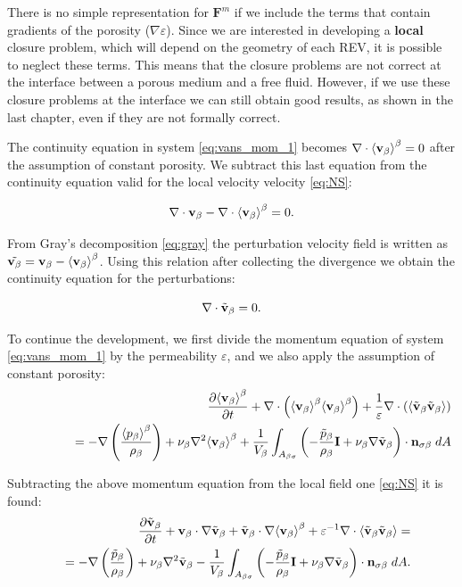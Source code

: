There is no simple representation for $\mathbf{F}^m$ if we include the terms that contain gradients of the porosity ($\nabla \varepsilon$).
Since we are interested in developing a \textbf{local} closure problem, which will depend on the geometry of each REV, it is possible to neglect these terms.
This means that the closure problems are not correct at the interface between a porous medium and a free fluid. 
However, if we use these closure problems at the interface we can still obtain good results, as shown in the last chapter, even if they are not formally correct.

The continuity equation in system \eqref{eq:vans_mom_1} becomes $ \nabla \cdot  {\left< \textbf{v}_{\beta}\right>}^{\beta}=0$ after the assumption of constant porosity.
We subtract this last equation from the continuity equation valid for the local velocity velocity \eqref{eq:NS}:

$$
\nabla \cdot  \textbf{v}_{\beta} - \nabla \cdot  {\left< \textbf{v}_{\beta}\right>}^{\beta} = 0.
$$

From Gray's decomposition \eqref{eq:gray} the perturbation velocity field is written as $\tilde{\textbf{v}_{\beta}} = \textbf{v}_{\beta} - {\left< \textbf{v}_{\beta} \right>}^{\beta}$. Using this relation after collecting the divergence we obtain the continuity equation for the perturbations:

\begin{equation}
\nabla \cdot \tilde{\textbf{v}}_{\beta} = 0.
\end{equation}

\newpage 
\noindent To continue the development, we first divide the momentum equation of system \eqref{eq:vans_mom_1} by the permeability $\varepsilon$, and we also apply the assumption of constant porosity:
\begin{eqnarray}
&& \dfrac{\partial {\left< \textbf{v}_{\beta}\right>}^{\beta}}{\partial t} + \nabla \cdot \left({\left< \textbf{v}_{\beta} \right>}^{\beta}{\left< \textbf{v}_{\beta} \right>}^{\beta}\right)   + \dfrac{1}{\varepsilon}\nabla \cdot \left({\left< \tilde{\textbf{v}}_{\beta} \tilde{\textbf{v}}_{\beta} \right>}\right)   \nonumber \\
&& \qquad \qquad = - \nabla \left(\dfrac{{\left< p_{\beta} \right>}^{\beta}}{\rho_{\beta}}\right) + \nu_{\beta}  \nabla^2 {\left< \textbf{v}_{\beta} \right>}^{\beta} + \dfrac{1}{V_\beta} \displaystyle\int_{A_{\beta \sigma}} \left(-\dfrac{\tilde{p}_{\beta}}{\rho_{\beta}} \mathbf{I}  + \nu_{\beta} \nabla \tilde{\textbf{v}}_{\beta} \right)\cdot \mathbf{n}_{\sigma \beta} \;dA  \nonumber
\end{eqnarray}


\noindent Subtracting the above momentum equation from the local field one \eqref{eq:NS} it is found:
\begin{eqnarray}
&&  \dfrac{\partial \tilde{\textbf{v}}_{\beta}}{\partial t} + \textbf{v}_{\beta} \cdot \nabla \tilde{\textbf{v}}_{\beta} + \tilde{\textbf{v}}_{\beta} \cdot \nabla {\left< \textbf{v}_{\beta}\right>}^{\beta} + \varepsilon^{-1}\nabla \cdot  {\left< \tilde{\textbf{v}}_{\beta}\tilde{\textbf{v}}_{\beta}\right>} = \nonumber \\
&&= -\nabla \left(\dfrac{\tilde{p}_{\beta}}{\rho_{\beta}}\right) + \nu_{\beta} \nabla^2 \tilde{\textbf{v}}_{\beta}  - \dfrac{1}{V_\beta} \displaystyle\int_{A_{\beta \sigma}} \left(-\dfrac{\tilde{p}_{\beta}}{\rho_{\beta}} \mathbf{I}  + \nu_{\beta} \nabla \tilde{\textbf{v}}_{\beta} \right) \cdot \mathbf{n}_{\sigma \beta} \;dA.
\label{eq:vans_mom_3}
\end{eqnarray}

